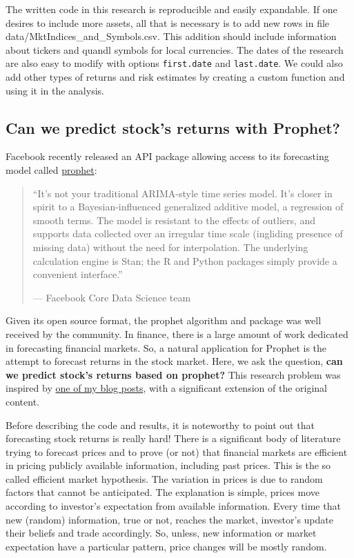 \documentclass[11pt,]{book}
\begin{document}
The written code in this research is reproducible and easily expandable.
If one desires to include more assets, all that is necessary is to add
new rows in file data/MktIndices\_and\_Symbols.csv. This addition should
include information about tickers and quandl symbols for local
currencies. The dates of the research are also easy to modify with
options \texttt{first.date} and \texttt{last.date}. We could also add
other types of returns and risk estimates by creating a custom function
and using it in the analysis.

\subsection{Can we predict stock's returns with
Prophet?}\label{research-prophet}

Facebook recently released an API package allowing access to its
forecasting model called
\href{http://blog.revolutionanalytics.com/2017/02/facebook-prophet.html}{prophet}:

\begin{quote}
``It's not your traditional ARIMA-style time series model. It's closer
in spirit to a Bayesian-influenced generalized additive model, a
regression of smooth terms. The model is resistant to the effects of
outliers, and supports data collected over an irregular time scale
(ingliding presence of missing data) without the need for interpolation.
The underlying calculation engine is Stan; the R and Python packages
simply provide a convenient interface.''

--- Facebook Core Data Science team
\end{quote}

Given its open source format, the prophet algorithm and package was well
received by the community. In finance, there is a large amount of work
dedicated in forecasting financial markets. So, a natural application
for Prophet is the attempt to forecast returns in the stock market.
Here, we ask the question, \textbf{can we predict stock's returns based
on prophet?} This research problem was inspired by
\href{https://msperlin.github.io/2017-03-05-Prophet-and_stock-market/}{one
of my blog posts}, with a significant extension of the original content.

Before describing the code and results, it is noteworthy to point out
that forecasting stock returns is really hard! There is a significant
body of literature trying to forecast prices and to prove (or not) that
financial markets are efficient in pricing publicly available
information, including past prices. This is the so called efficient
market hypothesis. The variation in prices is due to random factors that
cannot be anticipated. The explanation is simple, prices move according
to investor's expectation from available information. Every time that
new (random) information, true or not, reaches the market, investor's
update their beliefs and trade accordingly. So, unless, new information
or market expectation have a particular pattern, price changes will be
mostly random.
\end{document}
